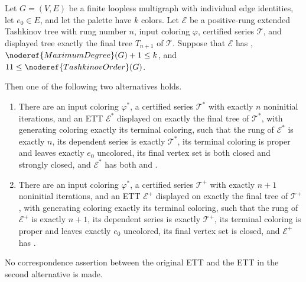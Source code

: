 \begin{corollary}
Let \(G=(V,E)\) be a finite loopless multigraph with individual edge
identities, let \(e_0\in E\), and let the palette have \(k\) colors.  Let
\(\mathcal E\) be a positive-rung extended Tashkinov tree with rung number
\(n\), input coloring \(\varphi\), certified series \(\mathcal T\), and
displayed tree exactly the final tree \(T_{n+1}\) of \(\mathcal T\).  Suppose
that \(\mathcal E\) has ,
\(\noderef{MaximumDegree}(G)+1\leq k\), and
\(11\leq\noderef{TashkinovOrder}(G)\).

Then one of the following two alternatives holds.
\begin{enumerate}
\item There are an input coloring \(\varphi^*\), a certified series
      \(\mathcal T^*\) with exactly \(n\) noninitial iterations, and an ETT
      \(\mathcal E^*\) displayed on exactly the final tree of
      \(\mathcal T^*\), with generating coloring exactly its terminal
      coloring, such that the rung of \(\mathcal E^*\) is exactly \(n\),
      its dependent series is exactly \(\mathcal T^*\), its terminal
      coloring is proper and leaves exactly \(e_0\) uncolored, its final
      vertex set is both closed and strongly closed, and
      \(\mathcal E^*\) has both  and
      .
\item There are an input coloring \(\varphi^*\), a certified series
      \(\mathcal T^+\) with exactly \(n+1\) noninitial iterations, and an
      ETT \(\mathcal E^+\) displayed on exactly the final tree of
      \(\mathcal T^+\), with generating coloring exactly its terminal
      coloring, such that the rung of \(\mathcal E^+\) is exactly \(n+1\),
      its dependent series is exactly \(\mathcal T^+\), its terminal
      coloring is proper and leaves exactly \(e_0\) uncolored, its final
      vertex set is closed, and \(\mathcal E^+\) has
      .
\end{enumerate}
No correspondence assertion between the original ETT and the ETT in the
second alternative is made.
\end{corollary}

